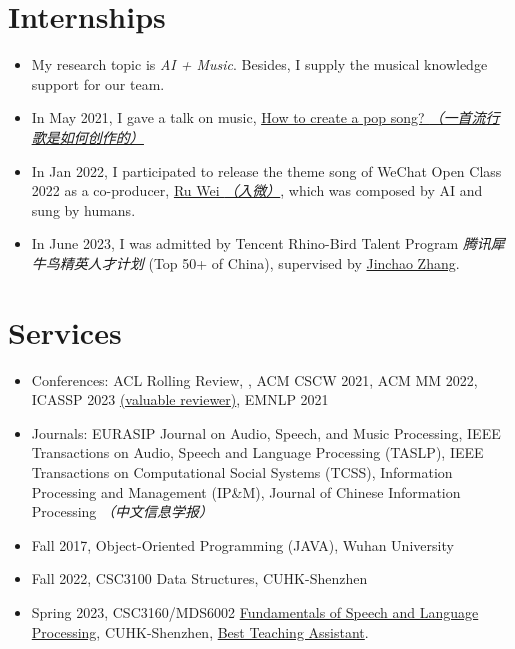\documentclass{resume}
\begin{document}
\section{Internships}
{\small {}
}
\begin{itemize}
  \item My research topic is \textit{AI + Music}. Besides, I supply the musical knowledge support for our
        team.
  \item In May 2021, I gave a talk on music,
        \href{https://www.zhangxueyao.com/data/wcpr-pop-music.pdf}{\underline{How to
            create a pop song? \textit{（一首流行歌是如何创作的）}}}
  \item In Jan 2022, I participated to release the theme song of WeChat Open Class 2022
        as a co-producer, \href{https://y.qq.com/n/ryqq/songDetail/000xeNJ53orPG2}{Ru
          Wei \textit{（入微）}}, which was composed by AI and sung by humans.
  \item In June 2023, I was admitted by Tencent Rhino-Bird Talent Program \textit{腾讯犀牛鸟精英人才计划}
        (Top 50+ of China), supervised by
        \href{https://scholar.google.com/citations?user=vH9YLsAAAAAJ&hl=en}{Jinchao
          Zhang}.
\end{itemize}

\section{Services}
\begin{itemize}
  \item Conferences: ACL Rolling Review, , ACM CSCW 2021, ACM MM 2022, ICASSP 2023
        \href{https://www.zhangxueyao.com/data/presentations/2023_icassp_reviewer.pdf}{(valuable
          reviewer)}, EMNLP 2021
  \item Journals: EURASIP Journal on Audio, Speech, and Music Processing, IEEE
        Transactions on Audio, Speech and Language Processing (TASLP), IEEE
        Transactions on Computational Social Systems (TCSS), Information Processing and
        Management (IP\&M), Journal of Chinese Information Processing \textit{（中文信息学报）}
\end{itemize}
\begin{itemize}
  \item Fall 2017, Object-Oriented Programming (JAVA), Wuhan University
  \item Fall 2022, CSC3100 Data Structures, CUHK-Shenzhen
  \item Spring 2023, CSC3160/MDS6002
        \href{https://drwuz.com/CSC3160/index.html}{Fundamentals of Speech and Language
          Processing}, CUHK-Shenzhen,
        \href{https://www.zhangxueyao.com/data/presentations/20230521_ta_award.pdf}{Best
          Teaching Assistant}.
\end{itemize}
\end{document}
